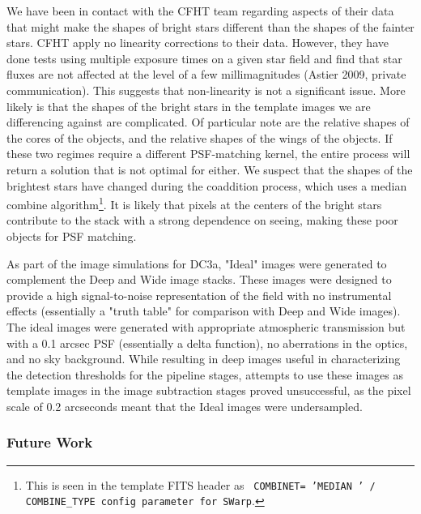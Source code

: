 We have been in contact with the CFHT team regarding aspects of their
data that might make the shapes of bright stars different than the
shapes of the fainter stars.  CFHT apply no linearity corrections to
their data.  However, they have done tests using multiple exposure
times on a given star field and find that star fluxes are not affected
at the level of a few millimagnitudes (Astier 2009, private
communication).  This suggests that non-linearity is not a
significant issue.  More likely is that the shapes of the bright stars
in the template images we are differencing against are complicated.
Of particular note are the relative shapes of the cores of the
objects, and the relative shapes of the wings of the objects.  If
these two regimes require a different PSF-matching kernel, the entire
process will return a solution that is not optimal for either.  We
suspect that the shapes of the brightest stars have changed during the
coaddition process, which uses a median combine
algorithm\footnote{This is seen in the template FITS header as {\tt
COMBINET= 'MEDIAN ' / COMBINE\_TYPE config parameter for SWarp}.}.  It
is likely that pixels at the centers of the bright stars contribute to
the stack with a strong dependence on seeing, making these poor
objects for PSF matching.

As part of the image simulations for DC3a, "Ideal" images were
generated to complement the Deep and Wide image stacks. These images
were designed to provide a high signal-to-noise representation of the
field with no instrumental effects (essentially a "truth table" for
comparison with Deep and Wide images). The ideal images were generated
with appropriate atmospheric transmission but with a 0.1 arcsec PSF
(essentially a delta function), no aberrations in the optics, and no
sky background. While resulting in deep images useful in
characterizing the detection thresholds for the pipeline stages,
attempts to use these images as template images in the image
subtraction stages proved unsuccessful, as the pixel scale of 0.2
arcseconds meant that the Ideal images were undersampled.



\subsubsection{Future Work}

